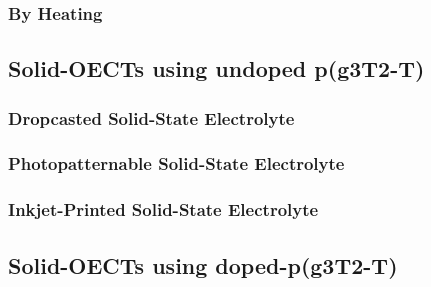 \subsubsection{By Heating}


\subsection{Solid-OECTs using undoped p(g3T2-T)}



\subsubsection{Dropcasted Solid-State Electrolyte}

\subsubsection{Photopatternable Solid-State Electrolyte}

\subsubsection{Inkjet-Printed Solid-State Electrolyte}



\subsection{Solid-OECTs using doped-p(g3T2-T)}




